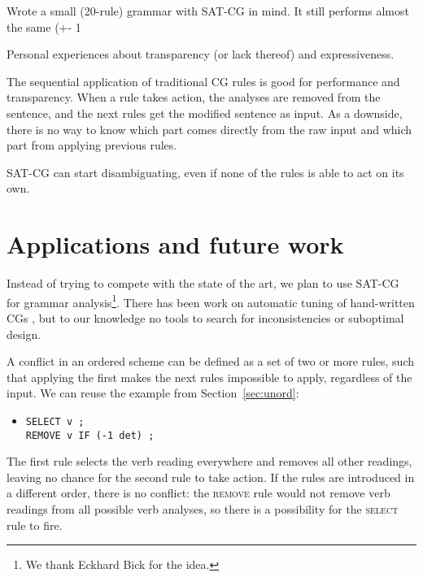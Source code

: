 Wrote a small (20-rule) grammar with SAT-CG in mind.  
It still performs almost the same (+- 1%

Personal experiences about transparency (or lack thereof) and expressiveness.


The sequential application of traditional CG rules is good for
performance and transparency. When a rule takes action, the analyses
are removed from the sentence, and the next rules get the modified
sentence as input. 
As a downside, there is no way to know which part comes directly from the
raw input and which part from applying previous rules.

SAT-CG  can start disambiguating, even if none of the rules is able to act on its own. 


\section{Applications and future work}
\label{sec:apps}
Instead of trying to compete with the state of the art, we plan to use SAT-CG for grammar analysis\footnote{We thank Eckhard Bick for the idea.}.
There has been work on automatic tuning of hand-written CGs
\cite{bick2013tuning}, but to our knowledge no tools to
search for inconsistencies or suboptimal design. %


A conflict in an ordered scheme can be defined as 
a set of two or more rules, such that applying the first makes the
next rules impossible to apply, regardless of the input.
We can reuse the example from Section~\ref{sec:unord}:

\begin{itemize}
\item [] \texttt{SELECT v ;} \\
         \texttt{REMOVE v IF (-1 det) ;}
\end{itemize}

The first rule selects the verb reading everywhere and removes
all other readings, leaving no chance for the second rule to take action.
If the rules are introduced in a different order, there is no
conflict: the \textsc{remove} rule would not remove verb readings from all
possible verb analyses, so there is a possibility for the \textsc{select} rule
to fire.



